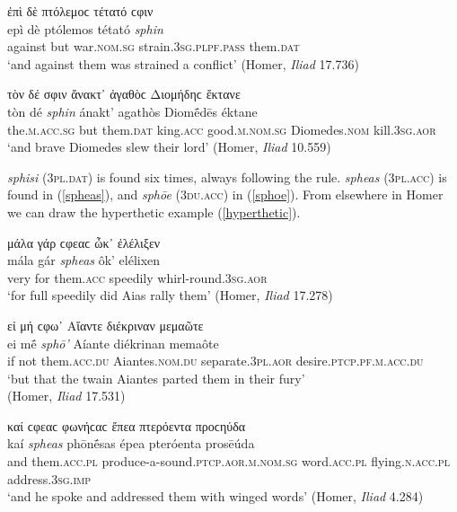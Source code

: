 \begin{exe}
\ex ἐπὶ δὲ πτόλεμοϲ τέτατό {ϲφιν}\\
\gll epì dè ptólemos tétató \emph{sphin}\\
against but war.\textsc{nom.sg} strain.\textsc{3sg.plpf.pass}
them.\textsc{dat}\\
\trans `and against them was strained a conflict' (Homer, \textit{Iliad} 17.736)
\label{sphin1}
\end{exe}

\begin{exe}
\ex τὸν δέ {σφιν} ἄνακτ᾽ ἀγαθὸϲ Διομήδηϲ ἔκτανε\\
\gll tòn dé \emph{sphin} ánakt' agathòs Diomḗdēs éktane\\
the.\textsc{m.acc.sg} but them.\textsc{dat} king.\textsc{acc} good.\textsc{m.nom.sg} Diomedes.\textsc{nom} kill.\textsc{3sg.aor}\\
\trans `and brave Diomedes slew their lord' (Homer, \textit{Iliad} 10.559)
\label{sphin2}
\end{exe}

\textit{sphisi} (\textsc{3pl.dat}) is found six times, always following the rule. \textit{spheas} (\textsc{3pl.acc}) is found in (\ref{spheas}), and \textit{sphōe} (\textsc{3du.acc}) in (\ref{sphoe}). From elsewhere in Homer we can draw the hyperthetic example (\ref{hyperthetic}).

\begin{exe}
\ex μάλα γάρ {ϲφεαϲ} ὦκ᾽ ἐλέλιξεν\\
\gll mála gár \emph{spheas} ôk' elélixen\\
very for them.\textsc{acc} speedily whirl-round.\textsc{3sg.aor}\\
\trans `for full speedily did Aias rally them' (Homer, \textit{Iliad} 17.278)
\label{spheas}
\end{exe}

\begin{exe}
\ex εἰ μή {ϲφω᾽} Αἴαντε διέκριναν μεμαῶτε\\
\gll ei mḗ \emph{sphō'} Aíante diékrinan memaôte\\
if not them.\textsc{acc.du} Aiantes.\textsc{nom.du} separate.\textsc{3pl.aor} desire.\textsc{ptcp.pf.m.acc.du}\\
\trans `but that the twain Aiantes parted them in their fury'\\
(Homer, \textit{Iliad} 17.531)
\label{sphoe}
\end{exe}

\begin{exe}
\ex καί {ϲφεαϲ} φωνήϲαϲ ἔπεα πτερόεντα προϲηύδα\\
\gll kaí \emph{spheas} phōnḗsas épea pteróenta prosēúda\\
and them.\textsc{acc.pl} produce-a-sound.\textsc{ptcp.aor.m.nom.sg} word.\textsc{acc.pl} flying.\textsc{n.acc.pl} address.\textsc{3sg.imp}\\
\trans `and he spoke and addressed them with winged words' (Homer, \textit{Iliad} 4.284)
\label{hyperthetic}
\end{exe}

